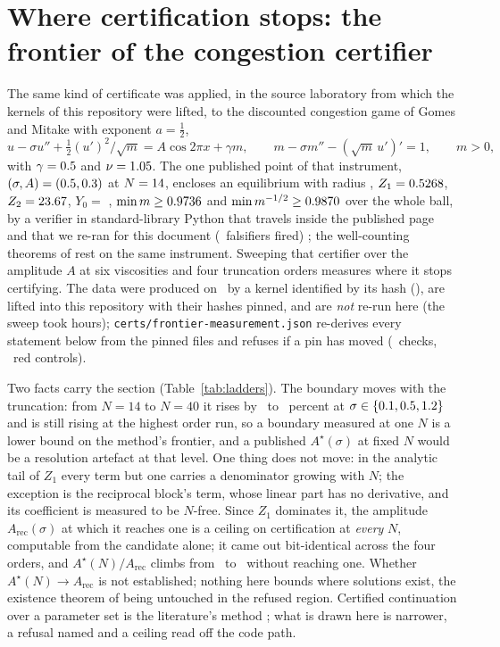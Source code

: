 \documentclass[11pt]{article}
\theoremstyle{definition}
\begin{document}
\section{Where certification stops: the frontier of the congestion certifier}\label{sec:frontier}

The same kind of certificate was applied, in the source laboratory from which the kernels of this repository were lifted, to the discounted congestion game of Gomes and Mitake \cite{GM15} with exponent $a=\tfrac12$,
\[
u-\sigma u''+\tfrac12(u')^2/\sqrt m=A\cos2\pi x+\gamma m,\qquad m-\sigma m''-(\sqrt m\,u')'=1,\qquad m>0,
\]
with $\gamma=0.5$ and $\nu=1.05$. The one published point of that instrument, $(\sigma,A)=(0.5,0.3)$ at $N=14$, encloses an equilibrium with radius \CongR, $Z_1=0.5268$, $Z_2=23.67$, $Y_0=$ \CongYzero, $\min m\ge0.9736$ and $\min m^{-1/2}\ge0.9870$ over the whole ball, by a verifier in standard-library Python that travels inside the published page and that we re-ran for this document (\CongReds\ falsifiers fired) \cite{CongestPage}; the well-counting theorems of \cite{TerraPeaks} rest on the same instrument. Sweeping that certifier over the amplitude $A$ at six viscosities and four truncation orders measures where it stops certifying. The data were produced on \FrontierMeasured\ by a kernel identified by its hash (\FrontierKernelSha), are lifted into this repository with their hashes pinned, and are \emph{not} re-run here (the sweep took hours); \texttt{certs/frontier-measurement.json} re-derives every statement below from the pinned files and refuses if a pin has moved (\FrontierChecks\ checks, \FrontierReds\ red controls).

Two facts carry the section (Table~\ref{tab:ladders}). The boundary moves with the truncation: from $N=14$ to $N=40$ it rises by \FrontierRiseMin\ to \FrontierRiseMax\ percent at $\sigma\in\{0.1, 0.5, 1.2\}$ and is still rising at the highest order run, so a boundary measured at one $N$ is a lower bound on the method's frontier, and a published $A^\star(\sigma)$ at fixed $N$ would be a resolution artefact at that level. One thing does not move: in the analytic tail of $Z_1$ every term but one carries a denominator growing with $N$; the exception is the reciprocal block's term, whose linear part has no derivative, and its coefficient is measured to be $N$-free. Since $Z_1$ dominates it, the amplitude $A_{\mathrm{rec}}(\sigma)$ at which it reaches one is a ceiling on certification at \emph{every} $N$, computable from the candidate alone; it came out bit-identical across the four orders, and $A^\star(N)/A_{\mathrm{rec}}$ climbs from \FrontierRatioMin\ to \FrontierRatioMax\ without reaching one. Whether $A^\star(N)\to A_{\mathrm{rec}}$ is not established; nothing here bounds where solutions exist, the existence theorem of \cite{GM15} being untouched in the refused region. Certified continuation over a parameter set is the literature's method \cite{DLM07,GLP16}; what is drawn here is narrower, a refusal named and a ceiling read off the code path.
\end{document}
